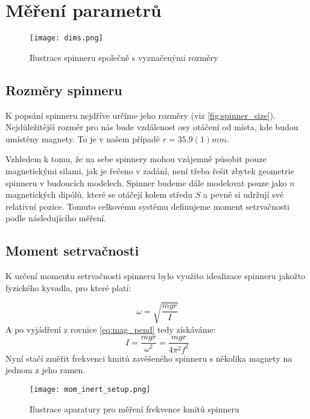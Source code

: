 \documentclass[12pt, a4paper,
 twoside,        %
 openright
]{report}
\begin{document}
\chapter{Měření parametrů}
\label{chap:param}

\begin{wrapfigure}{r}{0.5\textwidth}
    \vspace*{0.75cm}
    \texttt{[image: dims.png]}
    \centering
    \caption{Ilustrace spinneru společně s vyznačenými rozměry}
    \label{fig:spinner_size}
\end{wrapfigure}

\section{Rozměry spinneru}
\label{sec:spinner_size}
K popsání spinneru nejdříve určíme jeho rozměry (viz \autoref{fig:spinner_size}).
Nejdůležitější rozměr pro nás bude vzdálenost osy otáčení od místa, kde budou umístěny magnety.
To je v našem případě $r = 35.9(1)mm$.

Vzhledem k tomu, že na sebe spinnery mohou vzájemně působit pouze magnetickými silami, jak je řečeno v zadání, není třeba řešit zbytek geometrie spinneru v budoucích modelech.
Spinner budeme dále modelovat pouze jako $n$ magnetických dipólů, které se otáčejí kolem středu $S$ a pevně si udržují své relativní pozice.
Tomuto celkovému systému definujeme moment setrvačnosti podle následujícího měření.
\section{Moment setrvačnosti}
\label{sec:moment_of_inertia}
{\raggedright
    K určení momentu setrvačnosti spinneru bylo využito idealizace spinneru jakožto fyzického kyvadla, pro které platí: \cite{physical_pendulum}
}
\begin{equation}
    \label{eq:mag_pend}
    \omega = \sqrt{\frac{mgr}{I}}
\end{equation}
A po vyjádření z rovnice \ref{eq:mag_pend} tedy získáváme:
\begin{equation}
    \label{eq:mom_inert}
    I = \frac{mgr}{\omega^2} = \frac{mgr}{4\pi^2f^2}
\end{equation}
Nyní stačí změřit frekvenci kmitů zavěšeného spinneru s několika magnety na jednom z jeho ramen.

\begin{wrapfigure}{r}{0.5\textwidth}
    \vspace*{-0.75cm}
    \texttt{[image: mom\_inert\_setup.png]}
    \centering
    \caption{Ilustrace aparatury pro měření frekvence kmitů spinneru}
    \label{fig:spinner_pendulum_aparature}
\end{wrapfigure}
\end{document}
